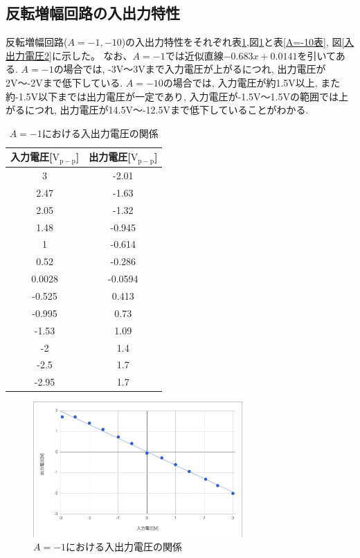 \documentclass[a4paper,11pt,uplatex]{jsarticle}
\begin{document}
\subsection{反転増幅回路の入出力特性}
反転増幅回路($A = -1,-10$)の入出力特性をそれぞれ表\ref{A=-1表},図\ref{入出力電圧1}と表\ref{A=-10表}, 図\ref{入出力電圧2}に示した。
なお、$A=-1$では近似直線$-0.683x + 0.0141$を引いてある.
$A=-1$の場合では, -3V〜3Vまで入力電圧が上がるにつれ, 出力電圧が2V〜-2Vまで低下している.
$A=-10$の場合では, 入力電圧が約1.5V以上, また約-1.5V以下までは出力電圧が一定であり,
入力電圧が-1.5V〜1.5Vの範囲では上がるにつれ, 出力電圧が14.5V〜-12.5Vまで低下していることがわかる.
\begin{table}[H]
	\caption{$A=-1$における入出力電圧の関係}
	\label{A=-1表}
	\begin{center}
    \begin{tabular}[H]{|c|c|}\hline
      入力電圧[$\mathrm{V_{p-p}}$] & 出力電圧[$\mathrm{V_{p-p}}$] \\ \hline
      3 & -2.01 \\ \hline
      2.47 & -1.63 \\ \hline
      2.05 & -1.32 \\ \hline
      1.48 & -0.945 \\ \hline
      1 & -0.614 \\ \hline
      0.52 & -0.286 \\ \hline
      0.0028 & -0.0594 \\ \hline
      -0.525 & 0.413 \\ \hline
      -0.995 & 0.73 \\ \hline
      -1.53 & 1.09 \\ \hline
      -2 & 1.4 \\ \hline
      -2.5 & 1.7 \\ \hline
      -2.95 & 1.7 \\ \hline
    \end{tabular}
\end{center}
\end{table}

\begin{figure}[H]
	\begin{center}
		\includegraphics[width=8cm]{画像/A=-1入出力.png}
		\caption{$A=-1$における入出力電圧の関係}
		\label{入出力電圧1}
	\end{center}
\end{figure}
\end{document}
